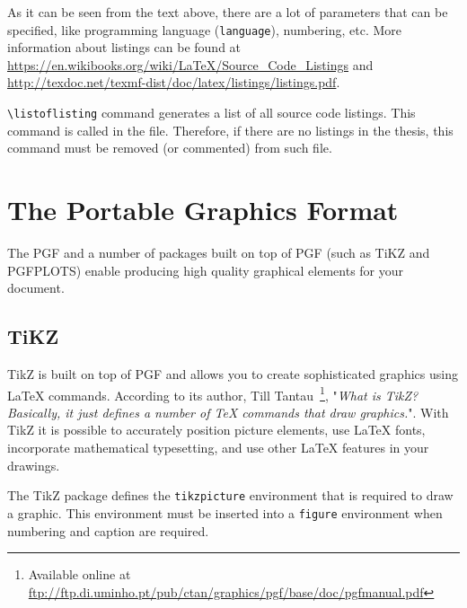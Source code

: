 As it can be seen from the text above, there are a lot of parameters that can be specified, like programming language (\verb|language|), numbering, etc.   
More information about listings can be found at 
\url{https://en.wikibooks.org/wiki/LaTeX/Source_Code_Listings} and 
\url{http://texdoc.net/texmf-dist/doc/latex/listings/listings.pdf}.


\verb|\listoflisting| command generates a list of all source code listings. This command is called in the  file. Therefore, if there are no listings in the thesis, this command must be removed (or commented) from such file.

\section{The Portable Graphics Format}
The \gls{PGF} and a number of packages built on top of \gls{PGF} (such as TiKZ and PGFPLOTS) enable producing high quality graphical elements for your document. 
 
\subsection{TiKZ}
TikZ is built on top of PGF and allows you to create sophisticated graphics using \LaTeX{} commands. According to its author, Till Tantau~\footnote{Available online at \url{ftp://ftp.di.uminho.pt/pub/ctan/graphics/pgf/base/doc/pgfmanual.pdf}},  "\textit{What is TikZ? Basically, it just defines a number of \TeX{} commands
that draw graphics.}". With TikZ it is possible to accurately position picture elements, use \LaTeX{} fonts, incorporate mathematical typesetting, and use other \LaTeX{} features in your drawings.

The TikZ package defines the \verb|tikzpicture| environment that is required to draw a graphic. 
This environment must be inserted into a \verb|figure| environment when numbering and caption are required.



